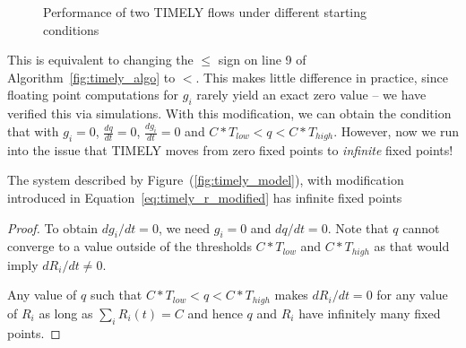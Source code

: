 \begin{figure}[t]
\center
{}
\vspace{-0.5em}
\caption{Performance of two TIMELY flows under different starting conditions}
\label{fig:timely_unstable}
\vspace{-1em}
\end{figure}

This is equivalent to changing the $\le$ sign on line 9 of
Algorithm~\ref{fig:timely_algo} to $<$. This makes little difference in
practice, since floating point computations for $g_i$ rarely yield an exact zero
value -- we have verified this via simulations. With this modification, we can
obtain the condition that with $g_i =0$, $\tfrac{dq}{dt} = 0$, $\tfrac{dg_i}{dt} =
0$ and $C*T_{low} < q < C*T_{high}$. However, now we run into the issue that
TIMELY moves from zero fixed points to \emph{infinite} fixed points!

\begin{thm}
The system described by Figure~(\ref{fig:timely_model}), with
modification introduced in Equation~\ref{eq:timely_r_modified} has
infinite fixed points
\end{thm}
\begin{proof}
To obtain ${dg_i}/{dt} =0$, we need $g_i = 0$ and ${dq}/{dt} = 0$.  Note that $q$
cannot converge to a value outside of the thresholds $ C*{T_{low}}$ and
$C*{T_{high}}$ as that would imply ${dR_i}/{dt} \ne 0$.

Any value of $q$ such that $C*T_{low} < q < C*T_{high}$ makes ${dR_i}/{dt} = 0$
for any value of $R_i$ as long as $\sum_{i} R_i(t) =  C$ and hence $q$
and $R_i$ have
infinitely many fixed points. 
\end{proof}

